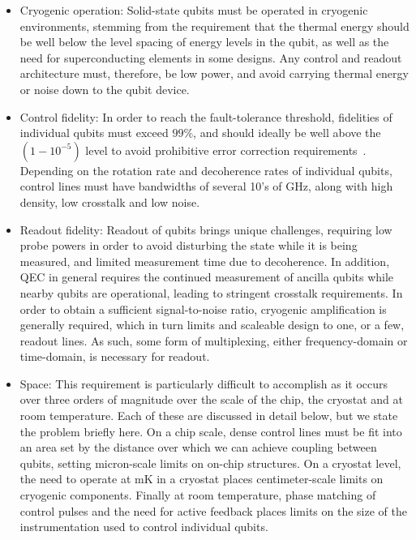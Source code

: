 \begin{itemize}
  \item Cryogenic operation: Solid-state qubits must be operated in cryogenic environments, stemming from the requirement that the thermal energy should be well below the level spacing of energy levels in the qubit, as well as the need for superconducting elements in some designs. Any control and readout architecture must, therefore, be low power, and avoid carrying thermal energy or noise down to the qubit device.
  \item Control fidelity: In order to reach the fault-tolerance threshold, fidelities of individual qubits must exceed $99\%$, and should ideally be well above the $(1 - 10^{-5})$ level to avoid prohibitive error correction requirements~\cite{6657074}. Depending on the rotation rate and decoherence rates of individual qubits, control lines must have bandwidths of several 10's of \si{\giga\hertz}, along with high density, low crosstalk and low noise.
  \item Readout fidelity: Readout of qubits brings unique challenges, requiring low probe powers in order to avoid disturbing the state while it is being measured, and limited measurement time due to decoherence. In addition, QEC in general requires the continued measurement of ancilla qubits while nearby qubits are operational, leading to stringent crosstalk requirements. In order to obtain a sufficient signal-to-noise ratio, cryogenic amplification is generally required, which in turn limits and scaleable design to one, or a few, readout lines. As such, some form of multiplexing, either frequency-domain or time-domain, is necessary for readout.
  \item Space: This requirement is particularly difficult to accomplish as it occurs over three orders of magnitude over the scale of the chip, the cryostat and at room temperature. Each of these are discussed in detail below, but we state the problem briefly here. On a chip scale, dense control lines must be fit into an area set by the distance over which we can achieve coupling between qubits, setting micron-scale limits on on-chip structures. On a cryostat level, the need to operate at \si{\milli\kelvin} in a cryostat places centimeter-scale limits on cryogenic components. Finally at room temperature, phase matching of control pulses and the need for active feedback places limits on the size of the instrumentation used to control individual qubits.
\end{itemize}

